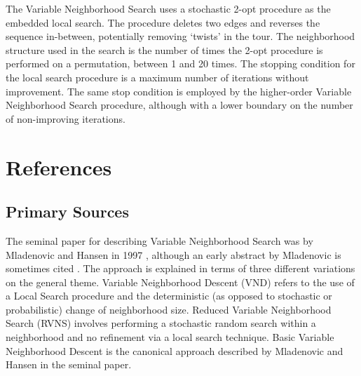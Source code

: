 \documentclass[a4paper, 11pt]{article}
\begin{document}
The Variable Neighborhood Search uses a stochastic 2-opt procedure as the embedded local search. The procedure deletes two edges and reverses the sequence in-between, potentially removing `twists' in the tour. The neighborhood structure used in the search is the number of times the 2-opt procedure is performed on a permutation, between 1 and 20 times. The stopping condition for the local search procedure is a maximum number of iterations without improvement. The same stop condition is employed by the higher-order Variable Neighborhood Search procedure, although with a lower boundary on the number of non-improving iterations.




\section{References}
\label{sec:references}

% 
% 
\subsection{Primary Sources}
The seminal paper for describing Variable Neighborhood Search was by Mladenovic and Hansen in 1997 \cite{Mladenovic1997}, although an early abstract by Mladenovic is sometimes cited \cite{Mladenovic1995}.
The approach is explained in terms of three different variations on the general theme. Variable Neighborhood Descent (VND) refers to the use of a Local Search procedure and the deterministic (as opposed to stochastic or probabilistic) change of neighborhood size. Reduced Variable Neighborhood Search (RVNS) involves performing a stochastic random search within a neighborhood and no refinement via a local search technique. Basic Variable Neighborhood Descent is the canonical approach described by Mladenovic and Hansen in the seminal paper.
\end{document}
